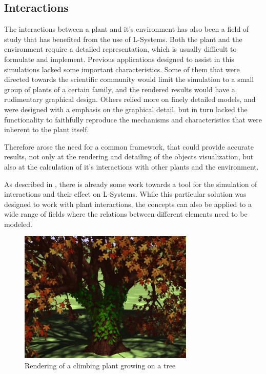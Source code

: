 \documentclass{acmtog}
\begin{document}
\subsection{Interactions}
\label{subsec:interactions}

The interactions between a plant and it's environment has also been a field of study that has benefited from the use of L-Systems. Both the plant and the environment require a detailed representation, which is usually difficult to formulate and implement. Previous applications designed to assist in this simulations lacked some important characteristics. Some of them that were directed towards the scientific community would limit the simulation to a small group of plants of a certain family, and the rendered results would have a rudimentary graphical design. Others relied more on finely detailed models, and were designed with a emphasis on the graphical detail, but in turn lacked the functionality to faithfully reproduce the mechanisms and characteristics that were inherent to the plant itself.

Therefore arose the need for a common framework, that could provide accurate results, not only at the rendering and detailing of the objects visualization, but also at the calculation of it's interactions with other plants and the environment.

As described in \cite{mech1996visual}, there is already some work towards a tool for the simulation of interactions and their effect on L-Systems. While this particular solution was designed to work with plant interactions, the concepts can also be applied to a wide range of fields where the relations between different elements need to be modeled.

\begin{figure}[!htp]
  \begin{center}
    \includegraphics[width=0.8\columnwidth]{images/7_plants}
    \caption{Rendering of a climbing plant growing on a tree \label{fig:relations}}
    \end{center}
\end{figure}
\end{document}
